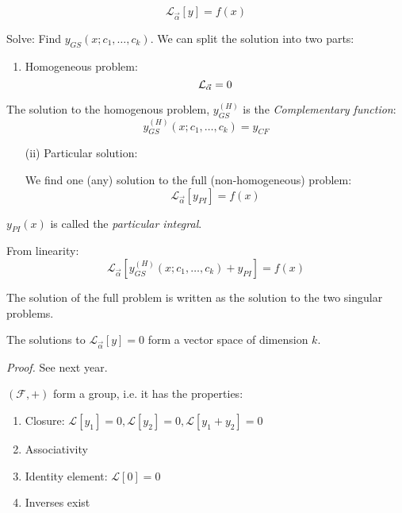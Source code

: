 \documentclass[10pt]{scrartcl}
\begin{document}
\[\mathcal{L}_{\vec{\alpha}}[y] = f(x)\]

Solve: Find $y_{GS}(x; c_1,\dots,c_k)$. We can split the solution into two parts: 

\begin{enumerate}
  \item Homogeneous problem: 
  \[\mathcal{L}_{\vec{\alpha}} = 0\vspace*{-5pt}\]
    \end{enumerate}\vspace*{5pt}
    
    \begin{definition}
  The solution to the homogenous problem, $y_{GS}^{(H)}$ is the \emph{Complementary function}: 	
    \[y_{GS}^{(H)}(x;c_1,\dots,c_k) = y_{CF}\]
  \end{definition}\vspace*{5pt}


\begin{enumerate}
  \item[(ii)] Particular solution: 
  
  We find one (any) solution to the full (non-homogeneous) problem:
    \[\mathcal{L}_{\vec{\alpha}}[y_{PI}] = f(x)\]
    
\end{enumerate}  

    
\begin{definition}
  $y_{PI}(x)$ is called the \emph{particular integral}.
  \end{definition}
 
  From linearity: 
  \[\mathcal{L}_{\vec{\alpha}}[y_{GS}^{(H)}(x;c_1,\dots,c_k)+y_{PI}] = f(x)\]
  
  The solution of the full problem is written as the solution to the two singular problems. 

\begin{theorem}
The solutions to $\mathcal{L}_{\vec{\alpha}}[y]=0$ form a vector space of dimension $k$. 	
\end{theorem}
\textit{Proof.} See next year. 

$(\mathcal{F}, +)$ form a group, i.e. it has the properties:
\begin{enumerate}
  \item Closure: $\mathcal{L}[y_1] = 0, \mathcal{L}[y_2] = 0, \mathcal{L}[y_1 + y_2] = 0$
  \item Associativity
  \item Identity element: $\mathcal{L}[0] = 0$
  \item Inverses exist
\end{enumerate}
\end{document}
